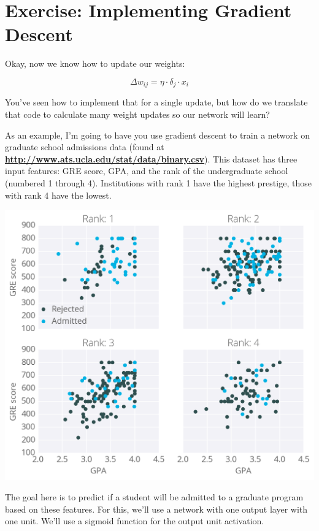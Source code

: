 \section{Exercise: Implementing Gradient Descent}

Okay, now we know how to update our weights:

\[\Delta w_{ij} = \eta \cdot \delta_j \cdot x_i\]


You've seen how to implement that for a single update, but how do we translate that code to calculate many weight updates so our network will learn? \newline

As an example, I'm going to have you use gradient descent to train a network on graduate school admissions data (found at \href{https://stats.idre.ucla.edu/stat/data/binary.csv}{\textbf{http://www.ats.ucla.edu/stat/data/binary.csv}}). This dataset has three input features: GRE score, GPA, and the rank of the undergraduate school (numbered 1 through 4). Institutions with rank 1 have the highest prestige, those with rank 4 have the lowest.

\includegraphics[width=1\linewidth]{img//intro/admissions-data.png}

The goal here is to predict if a student will be admitted to a graduate program based on these features. For this, we'll use a network with one output layer with one unit. We'll use a sigmoid function for the output unit activation.

